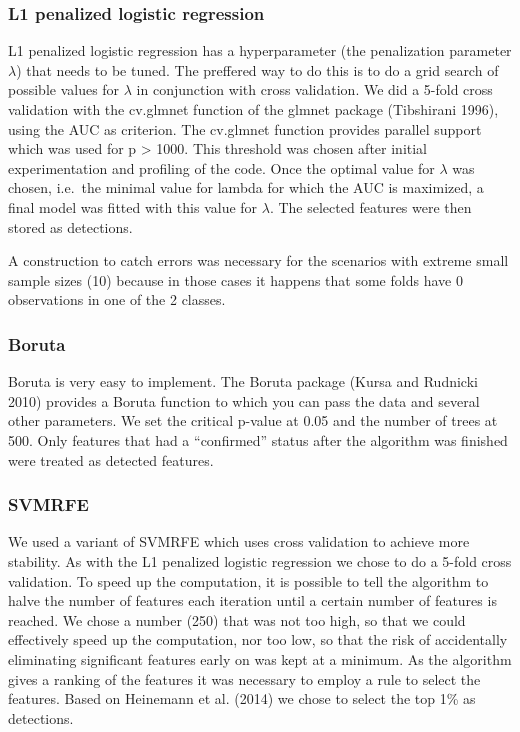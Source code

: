 \documentclass[
]{article}
\begin{document}
\hypertarget{l1-penalized-logistic-regression}{%
\subsubsection{L1 penalized logistic regression}\label{l1-penalized-logistic-regression}}

L1 penalized logistic regression has a hyperparameter (the penalization parameter \(\lambda\)) that needs to be tuned. The preffered way to do this is to do a grid search of possible values for \(\lambda\) in conjunction with cross validation. We did a 5-fold cross validation with the cv.glmnet function of the glmnet package (Tibshirani 1996), using the AUC as criterion. The cv.glmnet function provides parallel support which was used for p \textgreater{} 1000. This threshold was chosen after initial experimentation and profiling of the code. Once the optimal value for \(\lambda\) was chosen, i.e.~the minimal value for lambda for which the AUC is maximized, a final model was fitted with this value for \(\lambda\). The selected features were then stored as detections.

A construction to catch errors was necessary for the scenarios with extreme small sample sizes (10) because in those cases it happens that some folds have 0 observations in one of the 2 classes.

\hypertarget{boruta}{%
\subsubsection{Boruta}\label{boruta}}

Boruta is very easy to implement. The Boruta package (Kursa and Rudnicki 2010) provides a Boruta function to which you can pass the data and several other parameters. We set the critical p-value at 0.05 and the number of trees at 500. Only features that had a ``confirmed'' status after the algorithm was finished were treated as detected features.

\hypertarget{svmrfe}{%
\subsubsection{SVMRFE}\label{svmrfe}}

We used a variant of SVMRFE which uses cross validation to achieve more stability. As with the L1 penalized logistic regression we chose to do a 5-fold cross validation. To speed up the computation, it is possible to tell the algorithm to halve the number of features each iteration until a certain number of features is reached. We chose a number (250) that was not too high, so that we could effectively speed up the computation, nor too low, so that the risk of accidentally eliminating significant features early on was kept at a minimum. As the algorithm gives a ranking of the features it was necessary to employ a rule to select the features. Based on Heinemann et al. (2014) we chose to select the top 1\% as detections.
\end{document}

